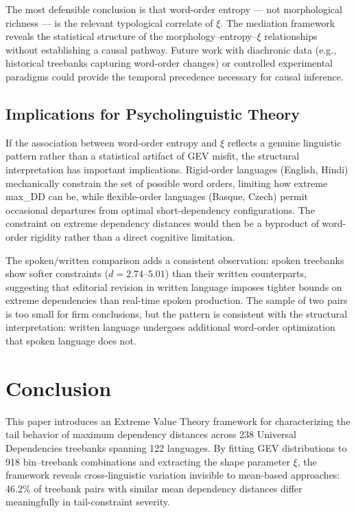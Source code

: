 \documentclass[11pt,letterpaper]{article}
\begin{document}
The most defensible conclusion is that word-order entropy --- not morphological richness --- is the relevant typological correlate of $\xi$. The mediation framework reveals the statistical structure of the morphology--entropy--$\xi$ relationships without establishing a causal pathway. Future work with diachronic data (e.g., historical treebanks capturing word-order changes) or controlled experimental paradigms could provide the temporal precedence necessary for causal inference.

\subsection{Implications for Psycholinguistic Theory}

If the association between word-order entropy and $\xi$ reflects a genuine linguistic pattern rather than a statistical artifact of GEV misfit, the structural interpretation has important implications. Rigid-order languages (English, Hindi) mechanically constrain the set of possible word orders, limiting how extreme max\_DD can be, while flexible-order languages (Basque, Czech) permit occasional departures from optimal short-dependency configurations. The constraint on extreme dependency distances would then be a byproduct of word-order rigidity rather than a direct cognitive limitation.

The spoken/written comparison adds a consistent observation: spoken treebanks show softer constraints ($d = 2.74$--$5.01$) than their written counterparts, suggesting that editorial revision in written language imposes tighter bounds on extreme dependencies than real-time spoken production. The sample of two pairs is too small for firm conclusions, but the pattern is consistent with the structural interpretation: written language undergoes additional word-order optimization that spoken language does not.

\section{Conclusion}

This paper introduces an Extreme Value Theory framework for characterizing the tail behavior of maximum dependency distances across 238 Universal Dependencies treebanks spanning 122 languages. By fitting GEV distributions to 918 bin--treebank combinations and extracting the shape parameter $\xi$, the framework reveals cross-linguistic variation invisible to mean-based approaches: 46.2\% of treebank pairs with similar mean dependency distances differ meaningfully in tail-constraint severity.
\end{document}
